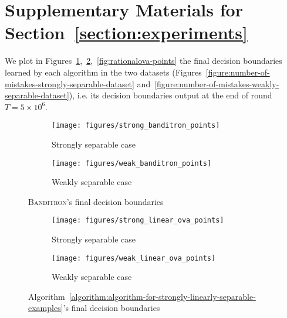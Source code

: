 \section{Supplementary Materials for Section~\ref{section:experiments}}
\label{section:supp-to-experiment}

We plot in
Figures~\ref{fig:banditron-points},~\ref{fig:linearova-points},~\ref{fig:rationalova-points}
the final decision boundaries learned by each algorithm in the two datasets (Figures~\ref{figure:number-of-mistakes-strongly-separable-dataset}
and~\ref{figure:number-of-mistakes-weakly-separable-dataset}), i.e. its decision boundaries
output at the end of round $T = 5 \times 10^6$.

\begin{figure}[h!]
    \centering
    \begin{subfigure}[b]{0.25\textwidth}
        \captionsetup{justification=centering}
        \begin{center}
        \texttt{[image: figures/strong\_banditron\_points]}
        \caption{Strongly separable case}
        \end{center}
    \end{subfigure}
    \begin{subfigure}[b]{0.25\textwidth}
        \captionsetup{justification=centering}
        \centering
        \texttt{[image: figures/weak\_banditron\_points]}
         \caption{Weakly separable case}
    \end{subfigure}
    \captionsetup{justification=centering}
    \caption{\textsc{Banditron}'s final decision boundaries}
     \label{fig:banditron-points}
\end{figure}

\begin{figure}[h!]
    \centering
    \begin{subfigure}[b]{0.25\textwidth}
        \captionsetup{justification=centering}
        \begin{center}
        \texttt{[image: figures/strong\_linear\_ova\_points]}
        \caption{Strongly separable case}
        \end{center}
    \end{subfigure}
    \begin{subfigure}[b]{0.25\textwidth}
        \captionsetup{justification=centering}
        \centering
        \texttt{[image: figures/weak\_linear\_ova\_points]}
         \caption{Weakly separable case}
    \end{subfigure}
    \captionsetup{justification=centering}
    \caption{Algorithm~\ref{algorithm:algorithm-for-strongly-linearly-separable-examples}'s final decision boundaries}
    \label{fig:linearova-points}
\end{figure}

